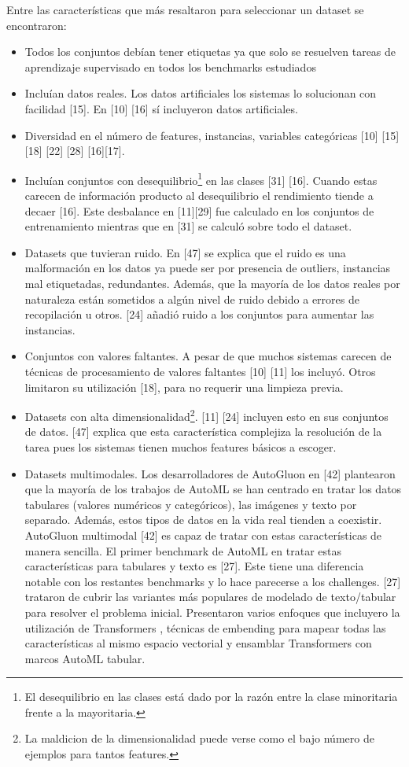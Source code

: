 Entre las características que más resaltaron para seleccionar un dataset se encontraron:
\begin{itemize}
    \item Todos los conjuntos debían tener etiquetas ya que solo se resuelven tareas de aprendizaje supervisado en todos los benchmarks estudiados
    \item Incluían datos reales. Los datos artificiales los sistemas lo solucionan con facilidad [15].  En [10] [16] sí incluyeron datos artificiales. 
    \item Diversidad en el número de features, instancias, variables categóricas [10] [15] [18] [22] [28] [16][17].
    \item Incluían conjuntos con desequilibrio\footnote{El desequilibrio en las clases está dado por la razón entre la clase minoritaria frente a la mayoritaria.} en 
    las clases [31] [16]. Cuando estas carecen de información producto al desequilibrio el rendimiento tiende a decaer [16]. Este desbalance en [11][29] fue calculado 
    en los conjuntos de entrenamiento mientras que en [31] se calculó sobre todo el dataset. 
    \item  Datasets que tuvieran ruido. En [47] se explica que el ruido es una malformación en los datos ya puede ser por presencia de outliers, instancias mal etiquetadas, 
    redundantes. Además, que la mayoría de los datos reales por naturaleza están sometidos a algún nivel de ruido debido a errores de recopilación u otros. [24] añadió 
    ruido a los conjuntos para aumentar las instancias.
    \item Conjuntos con valores faltantes. A pesar de que muchos sistemas carecen de técnicas de procesamiento de valores faltantes [10] [11] los incluyó. Otros 
    limitaron su utilización [18], para no requerir una limpieza previa.
    \item Datasets con alta dimensionalidad\footnote{La maldicion de la dimensionalidad puede verse como el bajo número de ejemplos para tantos features.}. [11] [24] 
    incluyen esto en sus conjuntos de datos. [47] explica que esta característica complejiza la resolución de la tarea pues los sistemas tienen muchos features básicos a escoger.
    \item Datasets multimodales. Los desarrolladores de AutoGluon en [42] plantearon que la mayoría de los trabajos de AutoML se han centrado en tratar los datos 
    tabulares (valores numéricos y categóricos), las imágenes y texto por separado. Además, estos tipos de datos en la vida real tienden a coexistir. AutoGluon 
    multimodal [42] es capaz de tratar con estas características de manera sencilla. El primer benchmark de AutoML en tratar estas características para tabulares y 
    texto es [27]. Este tiene una diferencia notable con los restantes benchmarks y lo hace parecerse a los challenges. [27] trataron de cubrir las variantes más 
    populares de modelado de texto/tabular para resolver el problema inicial. Presentaron varios enfoques que incluyero la utilización de Transformers , técnicas de 
    embending para mapear todas las características al mismo espacio vectorial y ensamblar Transformers con marcos AutoML tabular.   
    \end{itemize} 
